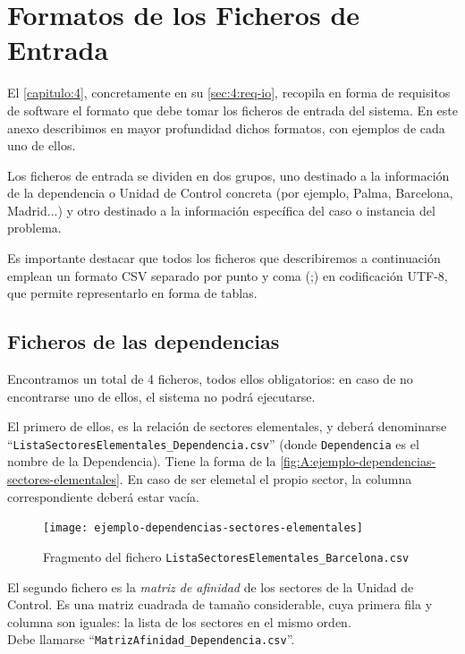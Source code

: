 \graphicspath{{anexos/AnexoA-Formato-Planificacion-Inicial/recursos/}}

\section{Formatos de los Ficheros de Entrada} \label{Anexo:formato-planificacion-inicial}

El \autoref{capitulo:4}, concretamente en su \autoref{sec:4:req-io}, recopila en forma de requisitos de software el formato que debe tomar los ficheros de entrada del sistema. En este anexo describimos en mayor profundidad dichos formatos, con ejemplos de cada uno de ellos.

Los ficheros de entrada se dividen en dos grupos, uno destinado a la información de la dependencia o Unidad de Control concreta (por ejemplo, Palma, Barcelona, Madrid...) y otro destinado a la información específica del caso o instancia del problema.

Es importante destacar que todos los ficheros que describiremos a continuación emplean un formato CSV separado por punto y coma (;) en codificación UTF-8, que permite representarlo en forma de tablas.

\subsection{Ficheros de las dependencias}

Encontramos un total de 4 ficheros, todos ellos obligatorios: en caso de no encontrarse uno de ellos, el sistema no podrá ejecutarse.

El primero de ellos, es la relación de sectores elementales, y deberá denominarse ``\texttt{ListaSectoresElementales\_Dependencia.csv}'' (donde \texttt{Dependencia} es el nombre de la Dependencia). Tiene la forma de la \autoref{fig:A:ejemplo-dependencias-sectores-elementales}. En caso de ser elemetal el propio sector, la columna correspondiente deberá estar vacía.

\begin{figure}[h]
	\centering
	\texttt{[image: ejemplo-dependencias-sectores-elementales]}
	\caption{Fragmento del fichero \texttt{ListaSectoresElementales\_Barcelona.csv}}
	\label{fig:A:ejemplo-dependencias-sectores-elementales}
\end{figure}

El segundo fichero es la \textit{matriz de afinidad} de los sectores de la Unidad de Control. Es una matriz cuadrada de tamaño considerable, cuya primera fila y columna son iguales: la lista de los sectores en el mismo orden. \\
Debe llamarse ``\texttt{MatrizAfinidad\_Dependencia.csv}''.

